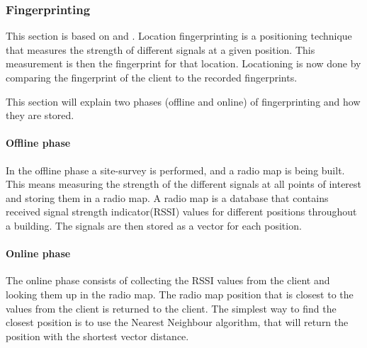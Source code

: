 \subsubsection{Fingerprinting}\label{fingerprinting}
This section is based on \citet{fingerprinting_slides} and \citet{fingerprinting}.
Location fingerprinting is a positioning technique that measures the strength of different signals at a given position.
This measurement is then the fingerprint for that location.
Locationing is now done by comparing the fingerprint of the client to the recorded fingerprints.

This section will explain two phases (offline and online) of fingerprinting and how they are stored.
\paragraph{Offline phase}
In the offline phase a site-survey is performed, and a radio map is being built.
This means measuring the strength of the different signals at all points of interest and storing them in a radio map.
A radio map is a database that contains received signal strength indicator(RSSI) values for different positions throughout a building.
The signals are then stored as a vector for each position.

\paragraph{Online phase}
The online phase consists of collecting the RSSI values from the client and looking them up in the radio map.
The radio map position that is closest to the values from the client is returned to the client.
The simplest way to find the closest position is to use the Nearest Neighbour algorithm, that will return the position with the shortest vector distance.
